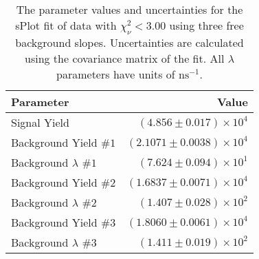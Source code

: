 
\begin{table}[h]
    \begin{center}
        \begin{tabular}{lr}\toprule
            Parameter & Value \\\midrule
            Signal Yield & $(4.856 \pm 0.017) \times 10^{4}$ \\
            Background Yield $\#1$ & $(2.1071 \pm 0.0038) \times 10^{4}$ \\
            Background $\lambda$ $\#1$ & $(7.624 \pm 0.094) \times 10^{1}$ \\
            Background Yield $\#2$ & $(1.6837 \pm 0.0071) \times 10^{4}$ \\
            Background $\lambda$ $\#2$ & $(1.407 \pm 0.028) \times 10^{2}$ \\
            Background Yield $\#3$ & $(1.8060 \pm 0.0061) \times 10^{4}$ \\
            Background $\lambda$ $\#3$ & $(1.411 \pm 0.019) \times 10^{2}$ \\\bottomrule
        \end{tabular}
        \caption{The parameter values and uncertainties for the sPlot fit of data with $\chi^2_\nu < 3.00$ using three free background slopes. Uncertainties are calculated using the covariance matrix of the fit. All $\lambda$ parameters have units of $\si{\nano\second}^{-1}$.}
    \end{center}
\end{table}
